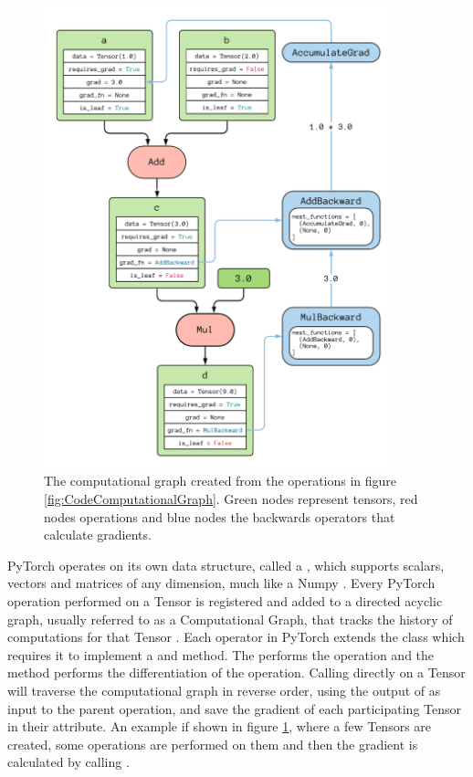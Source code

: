 \begin{figure}
    \centering
    \includegraphics[width=0.9\textwidth]{img/theory/ComputationalGraph.pdf}
    \caption{The computational graph created from the operations in figure \ref{fig:CodeComputationalGraph}. Green nodes represent tensors, red nodes operations and blue nodes the backwards operators that calculate gradients.}
    \label{fig:ComputationalGraph}
\end{figure}

PyTorch operates on its own data structure, called a , which supports scalars, vectors and matrices of any dimension, much like a Numpy . Every PyTorch operation performed on a Tensor is registered and added to a directed acyclic graph, usually referred to as a Computational Graph, that tracks the history of computations for that Tensor \cite{autograd}. Each operator in PyTorch extends the  class which requires it to implement a  and  method. The  performs the operation and the  method performs the differentiation of the operation. Calling  directly on a Tensor will traverse the computational graph in reverse order, using the output of  as input to the parent operation, and save the gradient of each participating Tensor in their  attribute. An example if shown in figure \ref{fig:ComputationalGraph}, where a few Tensors are created, some operations are performed on them and then the gradient is calculated by calling .

